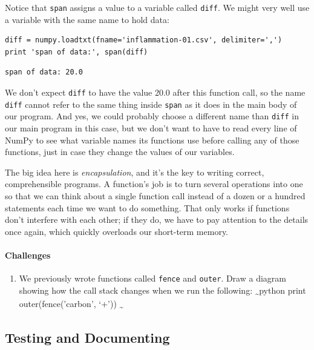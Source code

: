 \documentclass[]{book}
\newcommand{\gdef}[2]{\emph{#2}}
\begin{document}
Notice that \texttt{span} assigns a value to a variable called
\texttt{diff}. We might very well use a variable with the same name to
hold data:

\begin{verbatim}
diff = numpy.loadtxt(fname='inflammation-01.csv', delimiter=',')
print 'span of data:', span(diff)
\end{verbatim}

\begin{verbatim}
span of data: 20.0
\end{verbatim}

We don't expect \texttt{diff} to have the value 20.0 after this function
call, so the name \texttt{diff} cannot refer to the same thing inside
\texttt{span} as it does in the main body of our program. And yes, we
could probably choose a different name than \texttt{diff} in our main
program in this case, but we don't want to have to read every line of
NumPy to see what variable names its functions use before calling any of
those functions, just in case they change the values of our variables.

The big idea here is \gdef{g:encapsulation}{encapsulation}, and it's
the key to writing correct, comprehensible programs. A function's job is
to turn several operations into one so that we can think about a single
function call instead of a dozen or a hundred statements each time we
want to do something. That only works if functions don't interfere with
each other; if they do, we have to pay attention to the details once
again, which quickly overloads our short-term memory.

\mbox{}\paragraph{Challenges}

\begin{enumerate}
\item
  We previously wrote functions called \texttt{fence} and
  \texttt{outer}. Draw a diagram showing how the call stack changes when
  we run the following: \textsubscript{\textasciitilde{}}python print
  outer(fence('carbon', `+')) \textsubscript{\textasciitilde{}}
\end{enumerate}

\subsection{Testing and Documenting}
\end{document}
